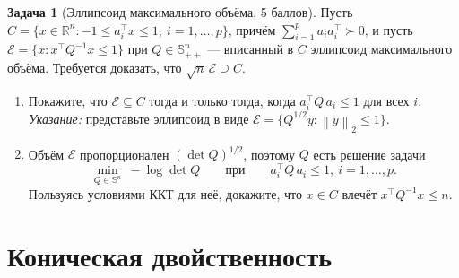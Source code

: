 \documentclass[11pt]{article}
\theoremstyle{definition}
\newtheorem{problem}{Задача}
\theoremstyle{starred}
\theoremstyle{definition}
\theoremstyle{remark}
\theoremstyle{plain}
\theoremstyle{definition}
\newcommand{\R}{\mathbb{R}}
\newcommand{\Sym}{\mathbb{S}}
\newcommand{\norm}[1]{\left\lVert #1 \right\rVert}
\begin{document}
\begin{problem}[Эллипсоид максимального объёма, 5 баллов]
Пусть $C = \{x \in \R^{n} : -1 \le a_i^{\top} x \le 1,\ i = 1,\dots,p\}$, причём $\sum_{i=1}^{p} a_i a_i^{\top} \succ 0$, и пусть
$\mathcal{E} = \{x : x^{\top} Q^{-1} x \le 1\}$ при $Q \in \Sym^{n}_{++}$ --- вписанный в $C$
эллипсоид максимального объёма. Требуется доказать, что $\sqrt{n}\,\mathcal{E} \supseteq C$.
\begin{enumerate}[label=(\alph*), nosep]
  \item Покажите, что $\mathcal{E} \subseteq C$ тогда и только тогда, когда
        $a_i^{\top} Q\, a_i \le 1$ для всех $i$. \emph{Указание:} представьте эллипсоид в виде
        $\mathcal{E} = \{Q^{1/2} y : \norm{y}_2 \le 1\}$.
  \item Объём $\mathcal{E}$ пропорционален $(\det Q)^{1/2}$, поэтому $Q$ есть решение задачи
        \[
        \min_{Q \in \Sym^{n}} \ -\log\det Q
        \qquad\text{при}\qquad a_i^{\top} Q\, a_i \le 1,\ i = 1,\dots,p .
        \]
        Пользуясь условиями ККТ для неё, докажите, что $x \in C$ влечёт $x^{\top} Q^{-1} x \le n$.
\end{enumerate}
\end{problem}

\section{Коническая двойственность}
\end{document}

